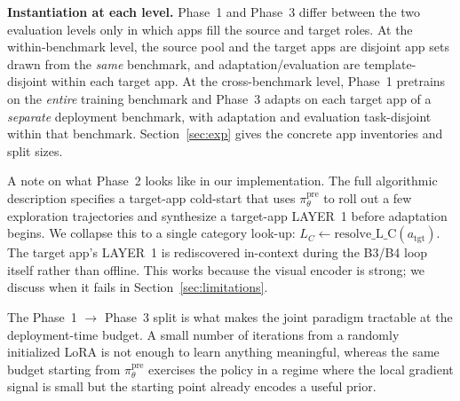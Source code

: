 \textbf{Instantiation at each level.} Phase~1 and Phase~3 differ between the two
evaluation levels only in which apps fill the source and target roles. At the
within-benchmark level, the source pool and the target apps are disjoint app
sets drawn from the \emph{same} benchmark, and adaptation/evaluation are
template-disjoint within each target app. At the cross-benchmark level, Phase~1
pretrains on the \emph{entire} training benchmark and Phase~3 adapts on each
target app of a \emph{separate} deployment benchmark, with adaptation and
evaluation task-disjoint within that benchmark. Section~\ref{sec:exp} gives the
concrete app inventories and split sizes.

A note on what Phase~2 looks like in our implementation. The full algorithmic
description specifies a target-app cold-start that uses $\pi^{\text{pre}}_\theta$
to roll out a few exploration trajectories and synthesize a target-app LAYER~1
before adaptation begins. We collapse this to a single category look-up: $L_C
\leftarrow \mathrm{resolve\_L\_C}(a_{\text{tgt}})$. The target app's LAYER~1 is
rediscovered in-context during the B3/B4 loop itself rather than offline. This
works because the visual encoder is strong; we discuss when it fails in
Section~\ref{sec:limitations}.

The Phase~1 $\to$ Phase~3 split is what makes the joint paradigm tractable at the
deployment-time budget. A small number of iterations from a randomly initialized
LoRA is not enough to learn anything meaningful, whereas the same budget starting
from $\pi^{\text{pre}}_\theta$ exercises the policy in a regime where the local
gradient signal is small but the starting point already encodes a useful prior.
